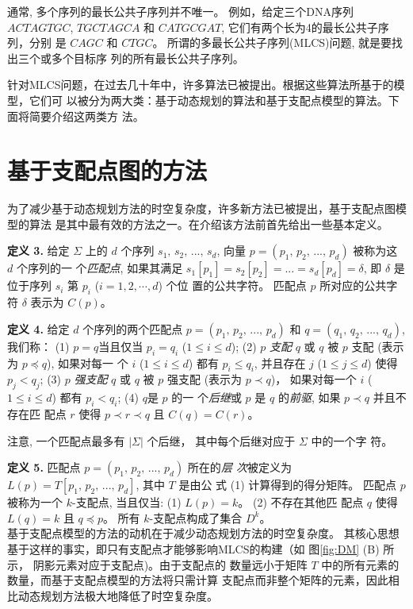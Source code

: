 通常, 多个序列的最长公共子序列并不唯一。 例如，给定三个DNA序列 $ACTAGTGC$,
$TGCTAGCA$ 和 $CATGCGAT$, 它们有两个长为4的最长公共子序列，分别
是 $CAGC$ 和 $CTGC$。 所谓的多最长公共子序列(MLCS)问题, 就是要找出三个或多个目标序
列的所有最长公共子序列。

针对MLCS问题，在过去几十年中，许多算法已被提出。根据这些算法所基于的模型，它们可
以被分为两大类：基于动态规划的算法和基于支配点模型的算法。下面将简要介绍这两类方
法。


\section{基于支配点图的方法}
\label{sec:Dominant Point}

为了减少基于动态规划方法的时空复杂度，许多新方法已被提出，基于支配点图模型的算法
是其中最有效的方法之一。在介绍该方法前首先给出一些基本定义。

\textbf{定义 3.} 给定 $\Sigma$ 上的 $d$ 个序列 $s_1,\, s_2,\, ...,\,
s_d$, 向量 $p = (p_1,\, p_2,\, ...,\, p_d)$ 被称为这 $d$ 个序列的一
个\emph{匹配点}, 如果其满足 $s_1[p_1] = s_2[p_2] = ... = s_d[p_d] =
\delta$, 即 $\delta$ 是位于序列 $s_i$ 第 $p_i$ ($i=1,2,\cdots,d$) 个位
置的公共字符。 匹配点 $p$ 所对应的公共字符 $\delta$ 表示为 $C(p)$。

\textbf{定义 4.} 给定 $d$ 个序列的两个匹配点 $p = (p_1,\, p_2,\,
...,\, p_d)$ 和 $q = (q_1,\, q_2,\, ...,\, q_d)$, 我们称： (1) $p =
q$当且仅当 $p_i = q_i$ ($1 \leq i \leq d$); (2) $p$
\emph{支配 }$q$ 或 $q$ 被 $p$ 支配 (表示为 $p \preceq q$), 如果对每一
个 $i$ ($1 \leq i \leq d$) 都有 $p_i \leq q_i$, 并且存在 $j$
($1 \leq j \leq d$) 使得 $p_j<q_j$; (3) $p$ \emph{强支配}
$q$ 或 $q$ 被 $p$ 强支配 (表示为 $p \prec q$)， 如果对每一个 $i$ ($1
\leq i \leq d$) 都有 $p_i < q_i$; (4) $q$是 $p$ 的一
个\emph{后继}或 $p$ 是 $q$ 的\emph{前驱}, 如果 $p \prec q$ 并且不存在匹
配点 $r$ 使得 $p \prec r \prec q$ 且 $C(q) = C(r)$。

注意, 一个匹配点最多有 $|\Sigma|$ 个后继， 其中每个后继对应于 $\Sigma$ 中的一个字
符。

\textbf{定义 5.} 匹配点 $p = (p_1,\, p_2,\, ...,\, p_d)$ 所在的\emph{层
  次}被定义为 $L(p) = T[p_1,\, p_2,\, ...,\, p_d]$, 其中 $T$ 是由公
式 (1) 计算得到的得分矩阵。 匹配点 $p$ 被称为一个 $k$-支配点, 当且仅当:
(1) $L(p) = k$。 (2) 不存在其他匹
配点 $q$ 使得 $L(q) = k$ 且 $q \preceq p$。 所有 $k$-支配点构成了集合 $D^k$。\\

基于支配点模型的方法的动机在于减少动态规划方法的时空复杂度。 其核心思想
基于这样的事实，即只有支配点才能够影响MLCS的构建（如
图\ref{fig:DM} (B) 所示， 阴影元素对应于支配点)。由于支配点的
数量远小于矩阵 $T$ 中的所有元素的数量，而基于支配点模型的方法将只需计算
支配点而非整个矩阵的元素，因此相比动态规划方法极大地降低了时空复杂度。

